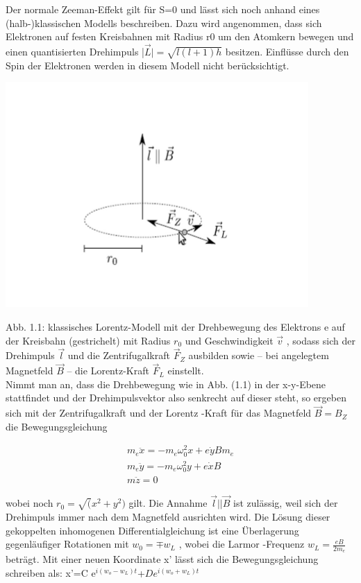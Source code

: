 \documentclass[10pt,a4paper]{article}
\begin{document}
Der normale Zeeman-Effekt gilt für S=0 und lässt sich noch anhand eines (halb-)klassischen Modells beschreiben. Dazu wird angenommen, dass sich Elektronen auf festen Kreisbahnen mit Radius r0  um den Atomkern bewegen und einen quantisierten Drehimpuls |$\overrightarrow{L}|=\sqrt{l(l+1)h}$ besitzen.  Einflüsse durch den Spin der Elektronen werden in diesem Modell nicht berücksichtigt.

\includegraphics{lotenzmodell}

Abb. 1.1: klassisches Lorentz-Modell mit der Drehbewegung des Elektrons e auf der Kreisbahn (gestrichelt) mit Radius $r_{0}$ und Geschwindigkeit $\overrightarrow{v}$ , sodass sich der Drehimpuls $\overrightarrow{l}$ und die Zentrifugalkraft $\overrightarrow{F}_{Z}$ ausbilden sowie – bei angelegtem Magnetfeld ⃗$\overrightarrow{B}$ – die Lorentz-Kraft ⃗$\overrightarrow{F}_{L}$ einstellt.\\


Nimmt man an, dass die Drehbewegung wie in Abb. (1.1) in der x-y-Ebene stattfindet und der Drehimpulsvektor also senkrecht auf dieser steht, so ergeben sich mit der Zentrifugalkraft
und der Lorentz -Kraft für das Magnetfeld $\overrightarrow{B}=B_{Z}$ die Bewegungsgleichung


\begin{align}
	m_{e}\ddot x=−m_{e}\omega_{0}^2 x+e\dot{y}B m_{e}\\
	m_{e}\ddot y=−m_{e}\omega_{0}^2 y+e\dot{x}B\\
	m\ddot z=0 
\end{align}


wobei noch $r_{0}=\sqrt (x^2+y^2)$ gilt. Die Annahme $\overrightarrow{l}|| \overrightarrow{B}$  ist zulässig, weil sich der Drehimpuls immer nach dem Magnetfeld ausrichten wird. Die Lösung dieser gekoppelten inhomogenen Differentialgleichung ist eine Überlagerung gegenläufiger Rotationen mit $w_{0}= \mp w_{L}$ , wobei die Larmor -Frequenz $w_{L} = \frac{eB}{2m_{e}}$ beträgt. Mit einer neuen Koordinate x' lässt sich die Bewegungsgleichung schreiben als: x'=C e$^{i(w_{o}-w_{L})t}$+$D e^{i(w_{o}+w_{L})t}$
\\
\end{document}
